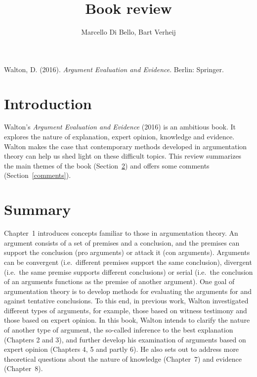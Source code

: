 \documentclass[12pt]{article}
\begin{document}
\title{Book review}

\author{}
\author{Marcello Di Bello, Bart Verheij}

\date{}

\maketitle


Walton, D. (2016). \emph{Argument Evaluation and Evidence}. Berlin: Springer.

\section{Introduction}

\noindent Walton's \emph{Argument Evaluation and Evidence} (2016) is an ambitious book. It explores the nature of explanation,
expert opinion, knowledge and evidence. Walton makes the case that
contemporary methods developed in argumentation theory can help us shed light on these difficult topics.
This review summarizes the main themes of the book (Section~\ref{summary}) and offers some comments (Section~\ref{comments}).

\section{Summary}
\label{summary}
\noindent Chapter~1 introduces concepts familiar to those in argumentation
theory. An argument consists of a set of premises and a conclusion,
and the premises can support the conclusion (pro arguments) or attack
it (con arguments). Arguments can be convergent (i.e.\ different
premises support the same conclusion), divergent (i.e.\ the same
premise supports different conclusions) or serial (i.e.\ the conclusion
of an arguments functions as the premise of another argument).
One goal of argumentation theory is to develop methods for evaluating 
the arguments for and against tentative conclusions. To this end, in previous work,
Walton investigated different types of arguments, for example, those
based on witness testimony and those based on expert opinion. In this
book, Walton intends to clarify the nature of another type of
argument, the so-called inference to the best explanation (Chapters 2
and 3), and further develop his examination of arguments based on
expert opinion (Chapters 4, 5 and partly 6). He also sets out to
address more theoretical questions about the nature of knowledge
(Chapter~7) and evidence (Chapter~8).
\end{document}
